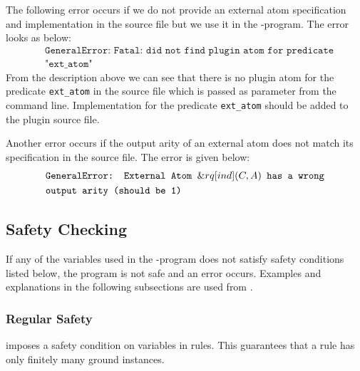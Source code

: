 \documentclass[a4paper, titlepage]{article}
\newcommand{\ext}[3]{\ensuremath{\&{#1}[#2](#3)}}
\begin{document}
The following error occurs if we do not provide an external atom specification and implementation 
in the source file but we use it in the \hex{}-program. The error looks as below:
\begin{align*}
& \texttt{GeneralError: Fatal: did not find plugin atom for predicate}\\ 
& \texttt{"ext\_atom"}
\end{align*}  
From the description above we can see that there is no plugin atom for the predicate \texttt{ext\_atom}
in the source file which is passed as parameter from the command line. Implementation for the predicate 
\texttt{ext\_atom} should be added to the plugin source file.

Another error occurs if the output arity of an external atom does not 
match its specification in the source file. The error is given below:
\begin{align*}
& \texttt{GeneralError: External Atom \ext{rq}{ind}{C,A} has a wrong} \\
& \texttt{output arity (should be 1)}
\end{align*}  

\subsection{Safety Checking}
\label{safetyCheck}
If any of the variables used in the \hex{}-program does not satisfy safety conditions listed below, the program is not safe and an error occurs. Examples and explanations in the following subsections are used from \cite{brfwilvpg2009}. 

\subsubsection{Regular Safety}
\dlvhex{} imposes a safety condition on variables in rules. 
This guarantees that a rule has only finitely many ground instances.
\end{document}
